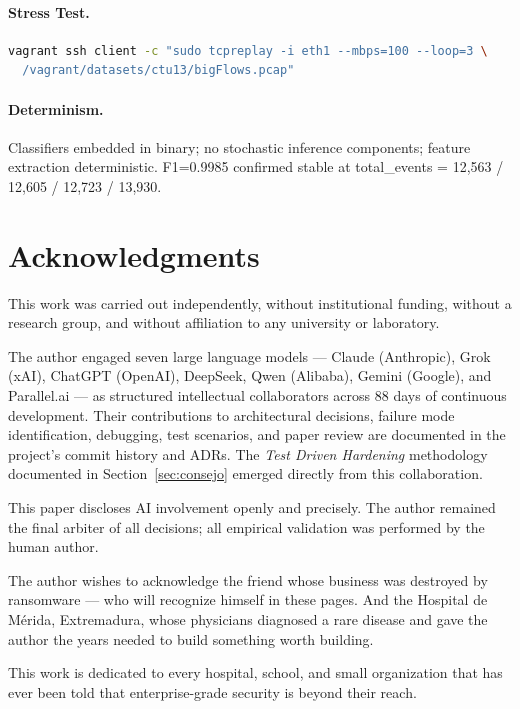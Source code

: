\documentclass[11pt,a4paper]{article}
\begin{document}
\paragraph{Stress Test.}
\begin{lstlisting}[language=bash]
vagrant ssh client -c "sudo tcpreplay -i eth1 --mbps=100 --loop=3 \
  /vagrant/datasets/ctu13/bigFlows.pcap"
\end{lstlisting}

\paragraph{Determinism.}
Classifiers embedded in binary; no stochastic inference components; feature extraction
deterministic. F1=0.9985 confirmed stable at total\_events = 12,563 / 12,605 / 12,723 /
13,930.

\section*{Acknowledgments}
\label{sec:acknowledgments}

This work was carried out independently, without institutional funding, without a research
group, and without affiliation to any university or laboratory.

The author engaged seven large language models --- Claude (Anthropic), Grok (xAI), ChatGPT
(OpenAI), DeepSeek, Qwen (Alibaba), Gemini (Google), and Parallel.ai --- as structured
intellectual collaborators across 88 days of continuous development. Their contributions to
architectural decisions, failure mode identification, debugging, test scenarios, and paper
review are documented in the project's commit history and ADRs. The \emph{Test Driven
Hardening} methodology documented in Section~\ref{sec:consejo} emerged directly from this
collaboration.

This paper discloses AI involvement openly and precisely. The author remained the final
arbiter of all decisions; all empirical validation was performed by the human author.

The author wishes to acknowledge the friend whose business was destroyed by ransomware ---
who will recognize himself in these pages. And the Hospital de M\'erida, Extremadura, whose
physicians diagnosed a rare disease and gave the author the years needed to build something
worth building.

\medskip
\noindent This work is dedicated to every hospital, school, and small organization that has
ever been told that enterprise-grade security is beyond their reach.




\end{document}
